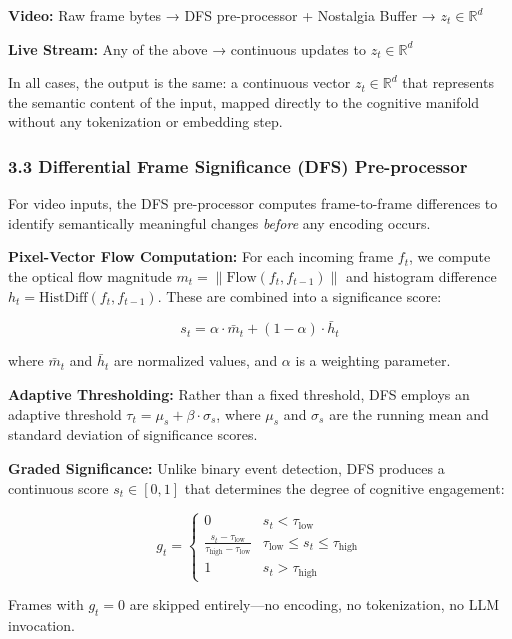 \documentclass[
  11pt,
  a4paper,
]{article}
\begin{document}
\textbf{Video:} Raw frame bytes → DFS pre-processor + Nostalgia Buffer →
\(z_t \in \mathbb{R}^{d}\)

\textbf{Live Stream:} Any of the above → continuous updates to
\(z_t \in \mathbb{R}^{d}\)

In all cases, the output is the same: a continuous vector
\(z_t \in \mathbb{R}^{d}\) that represents the semantic content of the
input, mapped directly to the cognitive manifold without any
tokenization or embedding step.

\subsubsection{3.3 Differential Frame Significance (DFS)
Pre-processor}\label{differential-frame-significance-dfs-pre-processor}

For video inputs, the DFS pre-processor computes frame-to-frame
differences to identify semantically meaningful changes \emph{before}
any encoding occurs.

\textbf{Pixel-Vector Flow Computation:} For each incoming frame \(f_t\),
we compute the optical flow magnitude
\(m_t = \|\text{Flow}(f_t, f_{t-1})\|\) and histogram difference
\(h_t = \text{HistDiff}(f_t, f_{t-1})\). These are combined into a
significance score:

\[
s_t = \alpha \cdot \bar{m}_t + (1 - \alpha) \cdot \bar{h}_t
\]

where \(\bar{m}_t\) and \(\bar{h}_t\) are normalized values, and
\(\alpha\) is a weighting parameter.

\textbf{Adaptive Thresholding:} Rather than a fixed threshold, DFS
employs an adaptive threshold \(\tau_t = \mu_s + \beta \cdot \sigma_s\),
where \(\mu_s\) and \(\sigma_s\) are the running mean and standard
deviation of significance scores.

\textbf{Graded Significance:} Unlike binary event detection, DFS
produces a continuous score \(s_t \in [0, 1]\) that determines the
degree of cognitive engagement:

\[
g_t = \begin{cases}
0 & s_t < \tau_{\text{low}} \\
\frac{s_t - \tau_{\text{low}}}{\tau_{\text{high}} - \tau_{\text{low}}} & \tau_{\text{low}} \leq s_t \leq \tau_{\text{high}} \\
1 & s_t > \tau_{\text{high}}
\end{cases}
\]

Frames with \(g_t = 0\) are skipped entirely---no encoding, no
tokenization, no LLM invocation.
\end{document}
